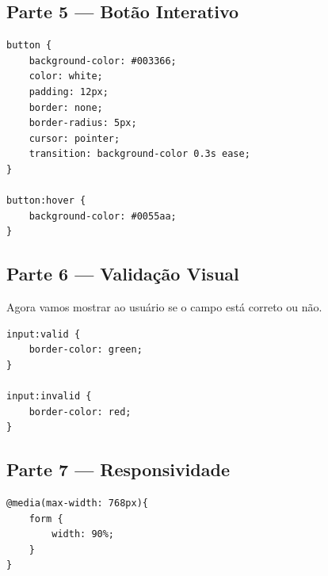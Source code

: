\documentclass[12pt,a4paper]{article}
\begin{document}

\subsection{Parte 5 — Botão Interativo}

\begin{boxCodigo}
\begin{verbatim}
button {
    background-color: #003366;
    color: white;
    padding: 12px;
    border: none;
    border-radius: 5px;
    cursor: pointer;
    transition: background-color 0.3s ease;
}

button:hover {
    background-color: #0055aa;
}
\end{verbatim}
\end{boxCodigo}


\subsection{Parte 6 — Validação Visual}

Agora vamos mostrar ao usuário se o campo está correto ou não.

\begin{boxCodigo}
\begin{verbatim}
input:valid {
    border-color: green;
}

input:invalid {
    border-color: red;
}
\end{verbatim}
\end{boxCodigo}


\subsection{Parte 7 — Responsividade}

\begin{boxCodigo}
\begin{verbatim}
@media(max-width: 768px){
    form {
        width: 90%;
    }
}
\end{verbatim}
\end{boxCodigo}
\end{document}
